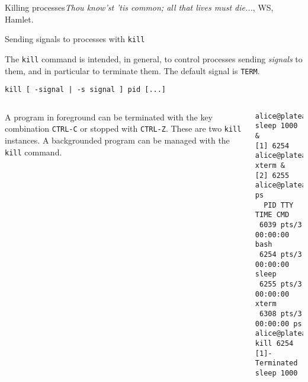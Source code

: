 \begin{frame}[t,fragile]{Killing processes}{\emph{Thou know'st 'tis common; all that lives must die...}, WS, Hamlet.}


  \begin{block}{Sending signals to processes with  \alert{\texttt{kill}}}
    {\footnotesize
The \alert{\texttt{kill}} command is intended, in general, to control
processes sending \emph{signals} to them, and in particular to terminate them. The default signal is \texttt{TERM}.


      \begin{lstlisting}
kill [ -signal | -s signal ] pid [...]
      \end{lstlisting}
 
}
{\scriptsize

  \begin{columns}
       A program in foreground can
      be terminated with the key combination \alert{\texttt{CTRL-C}} or stopped
      with \alert{\texttt{CTRL-Z}}. These are two \texttt{kill}
      instances. A backgrounded program can be managed with the
      \texttt{kill} command.
        \hspace{-3cm}
        \begin{lstlisting}
alice@platea:~$ sleep 1000 &
[1] 6254
alice@platea:~$ xterm &
[2] 6255
alice@platea:~$ ps
  PID TTY          TIME CMD
 6039 pts/3    00:00:00 bash
 6254 pts/3    00:00:00 sleep
 6255 pts/3    00:00:00 xterm
 6308 pts/3    00:00:00 ps
alice@platea:~$ kill 6254
[1]-  Terminated         sleep 1000
        \end{lstlisting}
    \end{columns}
  }
  \end{block}
  
\end{frame}
